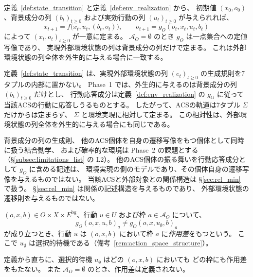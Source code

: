 定義~\ref{def:state_transition} と定義~\ref{def:env_realization} から、
初期値 $(x_0,o_0)$、背景成分の列 $(b_t)_{t\geq0}$ および実効行動の列
$(u_t)_{t\geq0}$ が与えられれば、
\[
  x_{t+1}=f\bigl(x_t,u_t,(b_t,o_t)\bigr),
  \qquad
  o_{t+1}=g_O(o_t,x_t,u_t,b_t)
\]
によって $(x_t,o_t)_{t\geq0}$ が一意に定まる。
$\mathcal A_O=\emptyset$ のとき $g_O$ は一点集合への定値写像であり、
実現外部環境状態の列は背景成分の列だけで定まる。
これは外部環境状態の列全体を外生的に与える場合に一致する。

\begin{remark}[実現外部環境状態の生成について]
\label{rem:exogenous_environment}
定義~\ref{def:state_transition} は、実現外部環境状態の列
$(e_t)_{t\geq0}$ の生成規則を7タプルの内部に置かない。
Phase~1 では、外生的に与えるのは背景成分の列 $(b_t)_{t\geq0}$ だけとし、
行動応答成分は定義~\ref{def:env_realization} の $g_O$ に従って
当該ACSの行動に応答しうるものとする。
したがって、ACSの軌道は7タプル $\Sigma$ だけからは定まらず、
$\Sigma$ と環境実現に相対して定まる。
この相対性は、外部環境状態の列全体を外生的に与える場合にも同じである。

背景成分の列の生成則、
他のACS個体を自身の遷移写像をもつ個体として同時に扱う結合動学、
および確率的な環境は Phase~2 の課題とする（\S\ref{subsec:limitations_list} の L2）。
他のACS個体の振る舞いを行動応答成分として $g_O$ に含める記述は、
環境実現の側のモデルであり、その個体自身の遷移写像を与えるものではない。
当該ACSと外部対象との関係構造は \S\ref{sec:rel_min} で扱う。
\S\ref{sec:rel_min} は関係の記述構造を与えるものであり、
外部環境状態の遷移則を与えるものではない。
\end{remark}

\begin{definition}
\label{def:action_difference}
$(o,x,b)\in O\times X\times E^{\mathrm{bg}}$、行動 $u\in U$ および枠 $a\in\mathcal A_O$ について、
\[
  g_O(o,x,u,b)_a\neq g_O(o,x,u_{\emptyset},b)_a
\]
が成り立つとき、行動 $u$ は $(o,x,b)$ において枠 $a$ に\emph{作用差}をもつという。
ここで $u_{\emptyset}$ は選択的待機である（備考~\ref{rem:action_space_structure}）。
\end{definition}

定義から直ちに、選択的待機 $u_{\emptyset}$ はどの $(o,x,b)$ においても
どの枠にも作用差をもたない。
また $\mathcal A_O=\emptyset$ のとき、作用差は定義されない。

